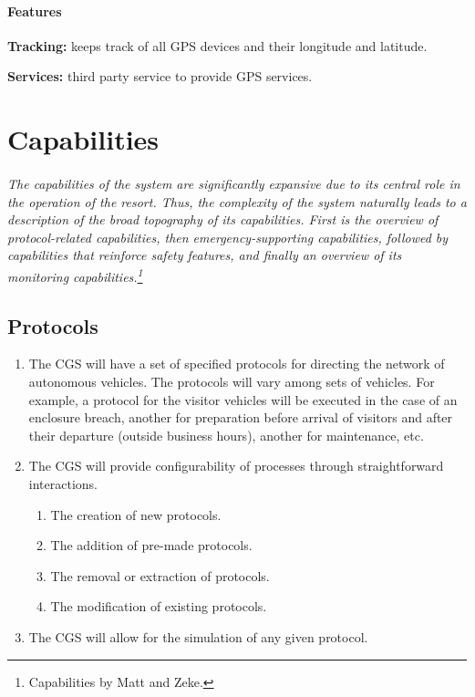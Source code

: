 \documentclass[12pt]{article}
\begin{document}
	\paragraph{Features}
	\begin{list}{}{}
		\item \textbf{Tracking: }keeps track of all GPS devices and their longitude and latitude.
        \item \textbf{Services: }third party service to provide GPS services. 
	\end{list}

\section{Capabilities}
\label{cap}
\paragraph{}\textit{The capabilities of the system are significantly expansive due to its central role
in the operation of the resort. Thus, the complexity of the system naturally leads to a description
of the broad topography of its capabilities. First is the overview of protocol-related capabilities, then
emergency-supporting capabilities, followed by capabilities that reinforce safety features, and finally an 
overview of its monitoring capabilities.\footnote {Capabilities by Matt and Zeke.}}
	\subsection{Protocols}
	\begin{enumerate}
		\item The CGS will have a set of specified protocols for directing the network of
		autonomous vehicles. The protocols will vary among sets of vehicles. For example, a protocol for the 
		visitor vehicles will be executed in the case of an enclosure breach, another for preparation before
		arrival of visitors and after their departure (outside business hours), another for maintenance, etc.
		\item The CGS will provide configurability of processes through straightforward interactions.
		\begin{enumerate}
			\item The creation of new protocols.
			\item The addition of pre-made protocols.
			\item The removal or extraction of protocols.
			\item The modification of existing protocols.
		\end{enumerate}
		\item The CGS will allow for the simulation of any given protocol.
	\end{enumerate}
	
\end{document}
